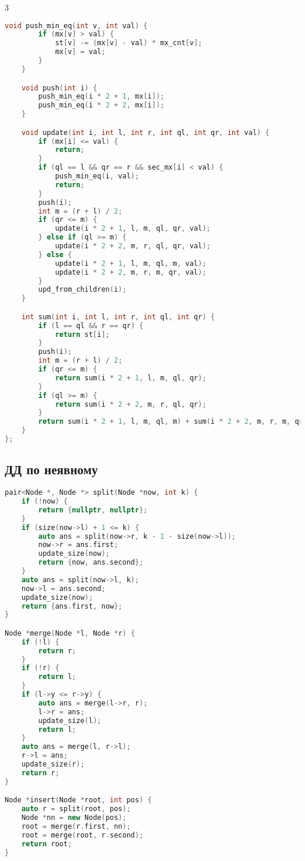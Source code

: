 \documentclass[10pt,a4paper,landscape,twosided]{extarticle}
\begin{document}
\begin{multicols}{3}
\begin{lstlisting}[language=C++]
    void push_min_eq(int v, int val) {
        if (mx[v] > val) {
            st[v] -= (mx[v] - val) * mx_cnt[v];
            mx[v] = val;
        }
    }

    void push(int i) {
        push_min_eq(i * 2 + 1, mx[i]);
        push_min_eq(i * 2 + 2, mx[i]);
    }

    void update(int i, int l, int r, int ql, int qr, int val) {
        if (mx[i] <= val) {
            return;
        }
        if (ql == l && qr == r && sec_mx[i] < val) {
            push_min_eq(i, val);
            return;
        }
        push(i);
        int m = (r + l) / 2;
        if (qr <= m) {
            update(i * 2 + 1, l, m, ql, qr, val);
        } else if (ql >= m) {
            update(i * 2 + 2, m, r, ql, qr, val);
        } else {
            update(i * 2 + 1, l, m, ql, m, val);
            update(i * 2 + 2, m, r, m, qr, val);
        }
        upd_from_children(i);
    }

    int sum(int i, int l, int r, int ql, int qr) {
        if (l == ql && r == qr) {
            return st[i];
        }
        push(i);
        int m = (r + l) / 2;
        if (qr <= m) {
            return sum(i * 2 + 1, l, m, ql, qr);
        }
        if (ql >= m) {
            return sum(i * 2 + 2, m, r, ql, qr);
        }
        return sum(i * 2 + 1, l, m, ql, m) + sum(i * 2 + 2, m, r, m, qr);
    }
};
\end{lstlisting}

\subsection{ДД по неявному}
\begin{lstlisting}[language=C++]
pair<Node *, Node *> split(Node *now, int k) {
    if (!now) {
        return {nullptr, nullptr};
    }
    if (size(now->l) + 1 <= k) {
        auto ans = split(now->r, k - 1 - size(now->l));
        now->r = ans.first;
        update_size(now);
        return {now, ans.second};
    }
    auto ans = split(now->l, k);
    now->l = ans.second;
    update_size(now);
    return {ans.first, now};
}

Node *merge(Node *l, Node *r) {
    if (!l) {
        return r;
    }
    if (!r) {
        return l;
    }
    if (l->y <= r->y) {
        auto ans = merge(l->r, r);
        l->r = ans;
        update_size(l);
        return l;
    }
    auto ans = merge(l, r->l);
    r->l = ans;
    update_size(r);
    return r;
}

Node *insert(Node *root, int pos) {
    auto r = split(root, pos);
    Node *nn = new Node(pos);
    root = merge(r.first, nn);
    root = merge(root, r.second);
    return root;
}


\end{lstlisting}
\end{multicols}
\end{document}
